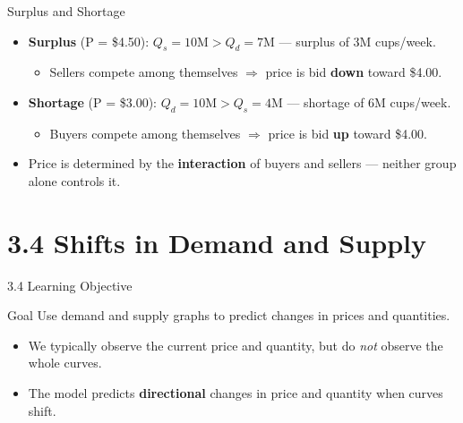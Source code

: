 \documentclass[aspectratio=169]{beamer}
\begin{document}
\begin{frame}{Surplus and Shortage}
\transfade
\begin{itemize}[<+->]
  \item \textbf{Surplus} (P = \$4.50): $Q_s = 10\text{M} > Q_d = 7\text{M}$ --- surplus of 3M cups/week.
  \begin{itemize}[<+->]
    \item Sellers compete among themselves $\Rightarrow$ price is bid \textbf{down} toward \$4.00.
  \end{itemize}
  \item \textbf{Shortage} (P = \$3.00): $Q_d = 10\text{M} > Q_s = 4\text{M}$ --- shortage of 6M cups/week.
  \begin{itemize}[<+->]
    \item Buyers compete among themselves $\Rightarrow$ price is bid \textbf{up} toward \$4.00.
  \end{itemize}
  \item Price is determined by the \textbf{interaction} of buyers and sellers --- neither group alone controls it.
\end{itemize}
\end{frame}

\section{3.4 Shifts in Demand and Supply}

\begin{frame}{3.4 Learning Objective}
\transfade
\begin{block}{Goal}
Use demand and supply graphs to predict changes in prices and quantities.
\end{block}
\begin{itemize}[<+->]
  \item We typically observe the current price and quantity, but do \emph{not} observe the whole curves.
  \item The model predicts \textbf{directional} changes in price and quantity when curves shift.
\end{itemize}
\end{frame}
\end{document}
